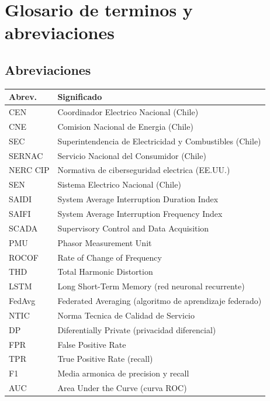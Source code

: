 \chapter{Glosario de terminos y abreviaciones}

\section{Abreviaciones}

\begin{longtable}{lp{10cm}}
\toprule
\textbf{Abrev.} & \textbf{Significado} \\
\midrule
\endhead
\bottomrule
\endfoot
CEN     & Coordinador Electrico Nacional (Chile) \\
CNE     & Comision Nacional de Energia (Chile) \\
SEC     & Superintendencia de Electricidad y Combustibles (Chile) \\
SERNAC  & Servicio Nacional del Consumidor (Chile) \\
NERC CIP& Normativa de ciberseguridad electrica (EE.UU.) \\
SEN     & Sistema Electrico Nacional (Chile) \\
SAIDI   & System Average Interruption Duration Index \\
SAIFI  & System Average Interruption Frequency Index \\
SCADA   & Supervisory Control and Data Acquisition \\
PMU     & Phasor Measurement Unit \\
ROCOF   & Rate of Change of Frequency \\
THD     & Total Harmonic Distortion \\
LSTM    & Long Short-Term Memory (red neuronal recurrente) \\
FedAvg  & Federated Averaging (algoritmo de aprendizaje federado) \\
NTIC    & Norma Tecnica de Calidad de Servicio \\
DP      & Diferentially Private (privacidad diferencial) \\
FPR     & False Positive Rate \\
TPR     & True Positive Rate (recall) \\
F1      & Media armonica de precision y recall \\
AUC     & Area Under the Curve (curva ROC) \\
\bottomrule
\end{longtable}


